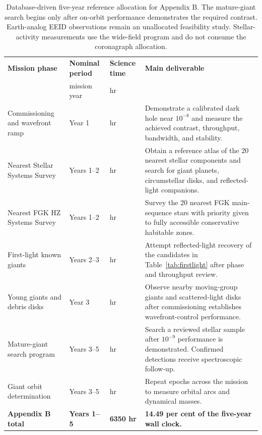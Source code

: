 \begin{table}[tp]
\centering
\sffamily\small
\begin{tabularx}{\textwidth}{@{}
  >{\raggedright\arraybackslash}p{3.5cm}
  >{\raggedright\arraybackslash}p{2.15cm}
  >{\raggedright\arraybackslash}p{2.4cm}
  >{\raggedright\arraybackslash}X@{}}
\toprule
\textbf{Mission phase} & \textbf{Nominal period} & \textbf{Science time} & \textbf{Main deliverable}\\
 & mission year & hr & \\
\midrule
Commissioning and wavefront ramp & Year 1 & 400 hr & Demonstrate a calibrated dark hole near $10^{-8}$ and measure the achieved contrast, throughput, bandwidth, and stability.\\
Nearest Stellar Systems Survey & Years 1--2 & 400 hr & Obtain a reference atlas of the 20 nearest stellar components and search for giant planets, circumstellar disks, and reflected-light companions.\\
Nearest FGK HZ Systems Survey & Years 1--2 & 2000 hr & Survey the 20 nearest FGK main-sequence stars with priority given to fully accessible conservative habitable zones.\\
First-light known giants & Years 2--3 & 400 hr & Attempt reflected-light recovery of the candidates in Table~\ref{tab:firstlight} after phase and throughput review.\\
Young giants and debris disks & Year 3 & 350 hr & Observe nearby moving-group giants and scattered-light disks after commissioning establishes wavefront-control performance.\\
Mature-giant search program & Years 3--5 & 2000 hr & Search a reviewed stellar sample after $10^{-9}$ performance is demonstrated. Confirmed detections receive spectroscopic follow-up.\\
Giant orbit determination & Years 3--5 & 800 hr & Repeat epochs across the mission to measure orbital arcs and dynamical masses.\\
\midrule
\textbf{Appendix B total} & \textbf{Years 1--5} & \textbf{6350 hr} & \textbf{14.49 per cent of the five-year wall clock.}\\
\bottomrule
\end{tabularx}
\caption{Database-driven five-year reference allocation for Appendix B. The
mature-giant search begins only after on-orbit performance demonstrates the
required contrast. Earth-analog EEID observations remain an unallocated
feasibility study. Stellar-activity measurements use the wide-field program
and do not consume the coronagraph allocation.}
\label{tab:exotimeline}
\end{table}

